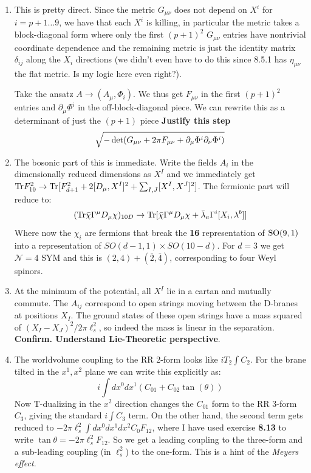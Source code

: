 \documentclass[11pt, class=article, crop=false]{standalone}
\begin{document}
\begin{enumerate}
	\item This is pretty direct. Since the metric $G_{\mu \nu}$ does not depend on $X^i$ for $i=p+1 \dots 9$, we have that each $X^i$ is killing, in particular the metric takes a block-diagonal form where only the first $(p+1)^2$ $G_{\mu \nu}$ entries have nontrivial coordinate dependence and the remaining metric is just the identity matrix $\delta_{ij}$ along the $X_i$ directions (we didn't even have to do this since 8.5.1 has $\eta_{\mu \nu}$ the flat metric. Is my logic here even right?). 
	
	Take the ansatz $A \to (A_\mu, \Phi_i)$. We thus get $F_{\mu \nu}$ in the first $(p+1)^2$ entries and $\partial_\mu \Phi^i$ in the off-block-diagonal piece. We can rewrite this as a determinant of just the $(p+1)$ piece \textbf{Justify this step}
	\[
		\sqrt{-\det(G_{\mu \nu} + 2 \pi F_{\mu \nu} + \partial_\mu \Phi^i \partial_\nu \Phi^i)}
	\]
	
	\item The bosonic part of this is immediate. Write the fields $A_i$ in the dimensionally reduced dimensions as $X^I$ and we immediately get $\mathrm{Tr} F^2_{10} \to \mathrm{Tr} [F_{d+1}^2 + 2 [D_\mu, X^I]^2 + \sum_{I, J} [X^I, X^J]^2]$. The fermionic part will reduce to:
	\[
		(\mathrm{Tr} \bar \chi \Gamma^\mu D_\mu \chi)_{10D} \to \mathrm{Tr} [\bar \chi \Gamma^\mu D_\mu \chi + \bar \lambda_a \Gamma^{i} [X_i , \lambda^b] ] 
	\] 
	Where now the $\chi_i$ are fermions that break the \textbf{16} representation of $\mathrm{SO}(9,1)$ into a representation of $SO(d-1, 1) \times SO(10-d)$. For $d = 3$ we get $\mathcal N = 4$ SYM and this is $(2, 4) + (\bar 2, \bar 4)$, corresponding to four Weyl spinors. 
	\item At the minimum of the potential, all $X^I$ lie in a cartan and mutually commute. The $A_{ij}$ correspond to open strings moving between the D-branes at positions $X_I$. The ground states of these open strings have a mass squared of $(X_I - X_J)^2/2 \pi \ell_s^2$, so indeed the mass is linear in the separation. \textbf{Confirm. Understand Lie-Theoretic perspective}.
	
	\item The worldvolume coupling to the RR 2-form looks like $i T_2 \int C_2$. For the brane tilted in the $x^1, x^2$ plane we can write this explicitly as:
	\[
		i \int dx^0 d x^1 (C_{01} + C_{02} \tan(\theta))
	\]
	Now T-dualizing in the $x^2$ direction changes the $C_{01}$ form to the RR 3-form $C_3$, giving the standard $i \int C_3$ term. On the other hand, the second term gets reduced to $-2 \pi \ell_s^2  \int dx^0 dx^1 dx^2 C_0 F_{12}$, where I have used exercise \textbf{8.13} to write $\tan \theta = -2\pi\ell_s^2 F_{12}$. So we get a leading coupling to the three-form and a sub-leading coupling (in $\ell_s^2$) to the one-form. This is a hint of the \emph{Meyers effect}.


\end{enumerate}
\end{document}
